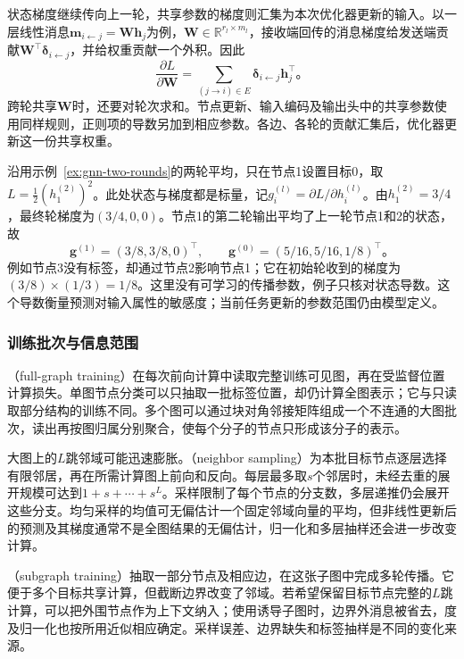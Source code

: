 状态梯度继续传向上一轮，共享参数的梯度则汇集为本次优化器更新的输入。以一层线性消息$\bm{m}_{i\leftarrow j}=\bm{W}\bm{h}_j$为例，$\bm{W}\in\mathbb{R}^{r_l\times m_l}$，接收端回传的消息梯度给发送端贡献$\bm{W}^{\top}\bm{\delta}_{i\leftarrow j}$，并给权重贡献一个外积。因此
\begin{equation}
  \frac{\partial L}{\partial\bm{W}}
    =\sum_{(j\to i)\in E}
      \bm{\delta}_{i\leftarrow j}\bm{h}_j^{\top}\text{。}
  \label{eq:gnn-shared-gradient}
\end{equation}
跨轮共享$\bm{W}$时，还要对轮次求和。节点更新、输入编码及输出头中的共享参数使用同样规则，正则项的导数另加到相应参数。各边、各轮的贡献汇集后，优化器更新这一份共享权重。

\begin{example}[无标签节点怎样得到梯度]
\label{ex:gnn-unlabeled-gradient}
沿用示例~\ref{ex:gnn-two-rounds}的两轮平均，只在节点1设置目标0，取$L=\tfrac12(h_1^{(2)})^2$。此处状态与梯度都是标量，记$g_i^{(l)}=\partial L/\partial h_i^{(l)}$。由$h_1^{(2)}=3/4$，最终轮梯度为$(3/4,0,0)$。节点1的第二轮输出平均了上一轮节点1和2的状态，故
\[
  \bm{g}^{(1)}=(3/8,3/8,0)^{\top},\qquad
  \bm{g}^{(0)}=(5/16,5/16,1/8)^{\top}\text{。}
\]
例如节点3没有标签，却通过节点2影响节点1；它在初始轮收到的梯度为$(3/8)\times(1/3)=1/8$。这里没有可学习的传播参数，例子只核对状态导数。这个导数衡量预测对输入属性的敏感度；当前任务更新的参数范围仍由模型定义。
\end{example}

\subsubsection{训练批次与信息范围}
\label{sec:gnn-training-batches}

（full-graph training）在每次前向计算中读取完整训练可见图，再在受监督位置计算损失。单图节点分类可以只抽取一批标签位置，却仍计算全图表示；它与只读取部分结构的训练不同。多个图可以通过块对角邻接矩阵组成一个不连通的大图批次，读出再按图归属分别聚合，使每个分子的节点只形成该分子的表示。

大图上的$L$跳邻域可能迅速膨胀。（neighbor sampling）为本批目标节点逐层选择有限邻居，再在所需计算图上前向和反向。每层最多取$s$个邻居时，未经去重的展开规模可达到$1+s+\cdots+s^L$。采样限制了每个节点的分支数，多层递推仍会展开这些分支。均匀采样的均值可无偏估计一个固定邻域向量的平均，但非线性更新后的预测及其梯度通常不是全图结果的无偏估计，归一化和多层抽样还会进一步改变计算。

（subgraph training）抽取一部分节点及相应边，在这张子图中完成多轮传播。它便于多个目标共享计算，但截断边界改变了邻域。若希望保留目标节点完整的$L$跳计算，可以把外围节点作为上下文纳入；使用诱导子图时，边界外消息被省去，度及归一化也按所用近似相应确定。采样误差、边界缺失和标签抽样是不同的变化来源。


